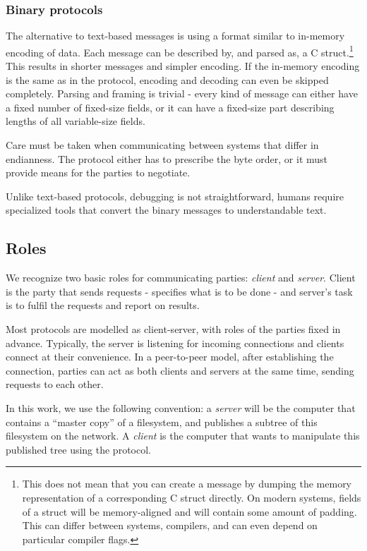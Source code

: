 \subsubsection{Binary protocols}

The alternative to text-based messages is using a format similar to in-memory encoding of data. Each message
can be described by, and parsed as, a C struct.\footnote{This does not mean that you can create a message by
dumping the memory representation of a corresponding C struct directly. On modern systems, fields of a struct
will be memory-aligned and will contain some amount of padding. This can differ between systems, compilers,
and can even depend on particular compiler flags.} This results in shorter messages and simpler encoding. If
the in-memory encoding is the same as in the protocol, encoding and decoding can even be skipped completely.
Parsing and framing is trivial - every kind of message can either have a fixed number of fixed-size fields, or
it can have a fixed-size part describing lengths of all variable-size fields.

Care must be taken when communicating between systems that differ in endianness.  The protocol either has to
prescribe the byte order, or it must provide means for the parties to negotiate.

Unlike text-based protocols, debugging is not straightforward, humans require specialized tools that convert
the binary messages to understandable text.


\subsection{Roles}

We recognize two basic roles for communicating parties: {\it client} and {\it server}. Client is the party
that sends requests - specifies what is to be done - and server's task is to fulfil the requests and report on
results.

Most protocols are modelled as client-server, with roles of the parties fixed in advance. Typically, the
server is listening for incoming connections and clients connect at their convenience. In a peer-to-peer
model, after establishing the connection, parties can act as both clients and servers at the same time,
sending requests to each other.

In this work, we use the following convention: a {\it server} will be the computer that contains a ``master
copy'' of a filesystem, and publishes a subtree of this filesystem on the network. A {\it client} is the
computer that wants to manipulate this published tree using the protocol.


